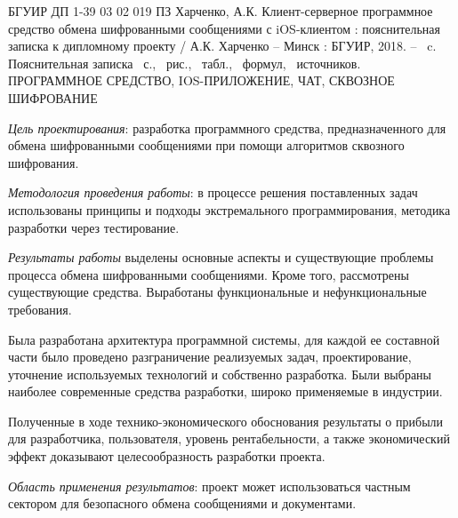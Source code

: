\thispagestyle{empty}


БГУИР ДП 1-39 03 02 019 ПЗ
\bigbreak
Харченко, А.К. Клиент-серверное программное средство обмена шифрованными сообщениями с iOS-клиентом : пояснительная записка к дипломному проекту / А.К. Харченко -- Минск : БГУИР, 2018. -- \totalpages~c.
\bigbreak
Пояснительная записка \totalpages~с., \totfig{}~рис., \tottab{}~табл., \toteq{}~формул, \totref{}~источников.
\bigbreak
\MakeUppercase{Программное средство, iOS-приложение, чат, сквозное шифрование}
\bigbreak

\textit{Цель проектирования}: разработка программного средства, предназначенного для обмена шифрованными сообщениями при помощи алгоритмов сквозного шифрования. 

\textit{Методология проведения работы}: в процессе решения поставленных задач использованы принципы и подходы экстремального программирования, методика разработки через тестирование.

\textit{Результаты работы} выделены основные аспекты и существующие проблемы процесса обмена шифрованными сообщениями. Кроме того, рассмотрены существующие средства. Выработаны функциональные и нефункциональные требования.

Была разработана архитектура программной системы, для каждой ее составной части было проведено разграничение реализуемых задач, проектирование, уточнение используемых технологий и собственно разработка. Были выбраны наиболее современные средства разработки, широко применяемые в индустрии. 

Полученные в ходе технико-экономического обоснования результаты о прибыли для разработчика, пользователя, уровень рентабельности, а также экономический эффект доказывают целесообразность разработки про\-екта.

\textit{Область применения результатов}: проект может использоваться частным сектором для безопасного обмена сообщениями и документами.
